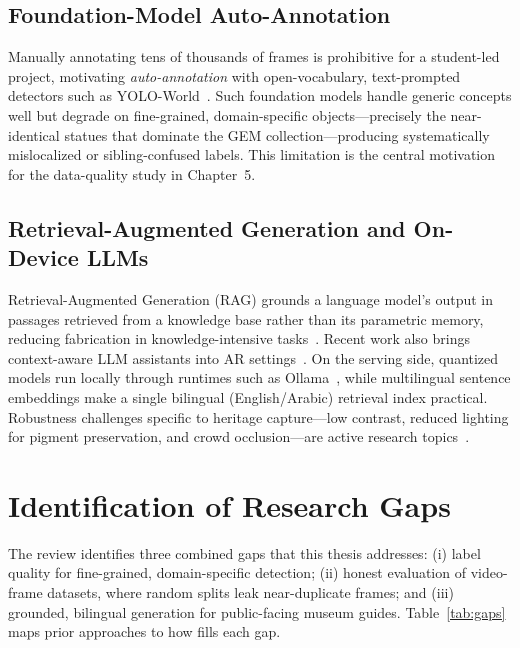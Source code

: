 \subsection{Foundation-Model Auto-Annotation}
Manually annotating tens of thousands of frames is prohibitive for a student-led
project, motivating \emph{auto-annotation} with open-vocabulary, text-prompted
detectors such as YOLO-World~\citep{yoloworld}. Such foundation models handle generic
concepts well but degrade on fine-grained, domain-specific objects---precisely the
near-identical statues that dominate the GEM collection---producing systematically
mislocalized or sibling-confused labels. This limitation is the central motivation for
the data-quality study in Chapter~5.

\subsection{Retrieval-Augmented Generation and On-Device LLMs}
Retrieval-Augmented Generation (RAG) grounds a language model's output in passages
retrieved from a knowledge base rather than its parametric memory, reducing
fabrication in knowledge-intensive tasks~\citep{lewis2020rag}. Recent work also brings
context-aware LLM assistants into AR settings~\citep{qorbani2025teaching}. On the
serving side, quantized models run locally through runtimes such as
Ollama~\citep{ollama}, while multilingual sentence embeddings make a single bilingual
(English/Arabic) retrieval index practical. Robustness challenges specific to heritage
capture---low contrast, reduced lighting for pigment preservation, and crowd
occlusion---are active research topics~\citep{liu2025yolov8,dai2024occlusion}.

\section{Identification of Research Gaps}

The review identifies three combined gaps that this thesis addresses: (i) label
quality for fine-grained, domain-specific detection; (ii) honest evaluation of
video-frame datasets, where random splits leak near-duplicate frames; and (iii)
grounded, bilingual generation for public-facing museum guides. Table~\ref{tab:gaps}
maps prior approaches to how \TimeLens{} fills each gap.

